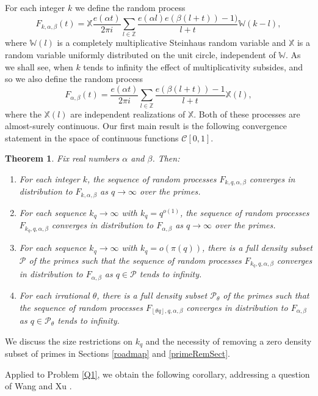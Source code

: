 \documentclass[12pt, a4paper]{amsart}
\newtheorem{theorem}{Theorem}
\theoremstyle{remark}
\newcommand{\Z}{\ensuremath{\mathbb{Z}}}
\newcommand{\floor}[1]{\left\lfloor#1\right\rfloor}
\newcommand{\bW}{\mathbb{W}}
\newcommand{\bX}{\mathbb{X}}
\newcommand{\cP}{\mathcal{P}}
\begin{document}
For each integer $k$ we define the random process
\[
    F_{k, \alpha,\beta}(t) = \bX \frac{e(\alpha t)}{2\pi i}
    \sum_{l \in \Z}
    \frac{e(\alpha l) e(\beta(l + t)) - 1)}
    {l + t}
    \bW(k-l),
\]
where $\bW(l)$ is a completely multiplicative Steinhaus random variable
and $\bX$ is a random variable uniformly distributed on the unit circle,
independent of $\bW$. As we shall see, when $k$ tends to infinity the effect of multiplicativity
subsides, and so we also define the random process
\[
    F_{\alpha,\beta}(t) = \frac{e(\alpha t)}{2\pi i}
    \sum_{l \in \Z}
    \frac{e(\beta(l + t)) - 1}
    {l + t}
    \bX(l),
\] where the $\bX(l)$ are independent realizations of $\bX$. 
Both of these processes are almost-surely continuous. Our first main result is
the following convergence statement in the space of continuous functions $\mathscr{C}[0,1].$
\begin{theorem}\label{thm:random-process}
    Fix real numbers $\alpha$ and $\beta$. Then:
\begin{enumerate}
    \item
    For each integer $k$, the sequence of random processes 
    $F_{k,q,\alpha,\beta}$ converges in distribution to $F_{k, \alpha, \beta}$
    as $q\to\infty$ over the primes.
    \item
    For each sequence
    $k_q \rightarrow \infty$ with $k_q = q^{o(1)}$,
    the sequence of random processes 
    $F_{k_q,q,\alpha,\beta}$ converges in distribution to $F_{\alpha, \beta}$
    as $q\to\infty$ over the primes.
    \item
    For each sequence
    $k_q \rightarrow \infty$ with $k_q  = o(\pi(q))$,
    there is a full density subset $\cP$ of the primes
    such that the sequence of random processes 
    $F_{k_q,q,\alpha,\beta}$ converges in distribution to $F_{\alpha, \beta}$
    as $q \in \cP$ tends to infinity.
    \item
    For each irrational
    $\theta$, there is a full density subset $\cP_\theta$ of the primes
    such that the sequence of random processes $F_{\floor{\theta
    q},q,\alpha,\beta}$ converges in distribution to $F_{\alpha,\beta}$ as $q
    \in \cP_\theta$ tends to infinity.
\end{enumerate}
\end{theorem}

We discuss the size restrictions on $k_q$ and the necessity of removing a zero
density subset of primes in Sections \ref{roadmap} and \ref{primeRemSect}.

Applied to Problem \ref{Q1}, we obtain the following corollary, addressing
a question of Wang and Xu \cite{wang-xu}. 
\end{document}
